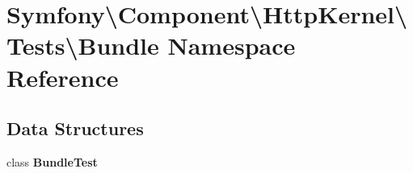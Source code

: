 \section{Symfony\textbackslash{}Component\textbackslash{}Http\+Kernel\textbackslash{}Tests\textbackslash{}Bundle Namespace Reference}
\label{namespace_symfony_1_1_component_1_1_http_kernel_1_1_tests_1_1_bundle}
\subsection*{Data Structures}
\begin{DoxyCompactItemize}
\item 
class {\bf Bundle\+Test}
\end{DoxyCompactItemize}
